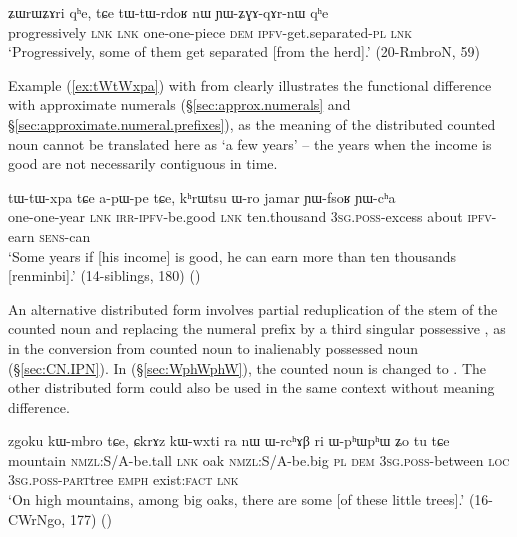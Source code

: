 \begin{exe}
\ex  \label{ex:tWtWrdoR}
\gll ʑɯrɯʑɤri qʰe, tɕe tɯ-tɯ-rdoʁ nɯ ɲɯ-ʑɣɤ-qɤr-nɯ qʰe \\
 progressively \textsc{lnk} \textsc{lnk} one-one-piece \textsc{dem} \textsc{ipfv}-get.separated-\textsc{pl} \textsc{lnk} \\
\glt `Progressively, some of them get separated [from the herd].' (20-RmbroN, 59)
\end{exe}

Example (\ref{ex:tWtWxpa}) with  from  clearly illustrates the functional difference with approximate numerals (§\ref{sec:approx.numerals} and §\ref{sec:approximate.numeral.prefixes}), as the meaning of the distributed counted noun cannot be translated here as `a few years' -- the years when the income is good are not necessarily contiguous in time.

\begin{exe}
\ex  \label{ex:tWtWxpa}
\gll   tɯ-tɯ-xpa tɕe a-pɯ-pe tɕe, kʰrɯtsu ɯ-ro jamar ɲɯ-fsoʁ ɲɯ-cʰa \\
one-one-year  \textsc{lnk} \textsc{irr}-\textsc{ipfv}-be.good \textsc{lnk} ten.thousand \textsc{3sg}.\textsc{poss}-excess about \textsc{ipfv}-earn \textsc{sens}-can \\ 
\glt `Some years if [his income] is good, he can earn more than ten thousands [renminbi].' (14-siblings, 180)
()
\end{exe}

An alternative distributed form involves partial reduplication of the stem of the counted noun and replacing the numeral prefix by a third singular possessive , as in the conversion from counted noun to inalienably possessed noun (§\ref{sec:CN.IPN}). In (§\ref{sec:WphWphW}), the counted noun  is changed to . The other distributed form  could also be used in the same context without meaning difference. 

\begin{exe}
\ex \label{sec:WphWphW}
\gll zgoku kɯ-mbro tɕe, ɕkrɤz kɯ-wxti ra nɯ ɯ-rcʰɤβ ri ɯ-pʰɯ\redp{}pʰɯ ʑo tu tɕe \\
mountain \textsc{nmzl}:S/A-be.tall \textsc{lnk} oak \textsc{nmzl}:S/A-be.big \textsc{pl} \textsc{dem} \textsc{3sg}.\textsc{poss}-between \textsc{loc} \textsc{3sg}.\textsc{poss}-\textsc{part}\redp{}tree \textsc{emph} exist:\textsc{fact} \textsc{lnk} \\
\glt `On high mountains, among big oaks, there are some [of these little trees].' (16-CWrNgo, 177)
()
\end{exe}   

